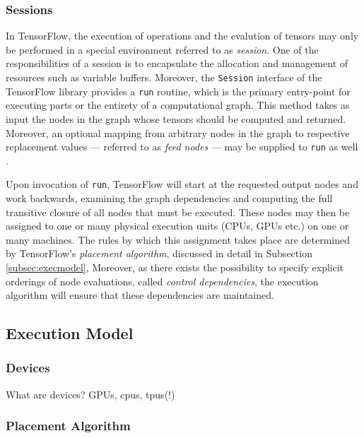 \subsubsection{Sessions}\label{sec:model-graphs-sessions}

In TensorFlow, the execution of operations and the evalution of tensors may only
be performed in a special environment referred to as \emph{session}. One of the
responsibilities of a session is to encapsulate the allocation and management of
resources such as variable buffers. Moreover, the \texttt{Session} interface of
the TensorFlow library provides a \texttt{run} routine, which is the primary
entry-point for executing parts or the entirety of a computational graph. This
method takes as input the nodes in the graph whose tensors should be computed
and returned. Moreover, an optional mapping from arbitrary nodes in the graph to
respective replacement values --- referred to as \emph{feed nodes} --- may be
supplied to \texttt{run} as well \cite{tensorflow}.

Upon invocation of \texttt{run}, TensorFlow will start at the requested output
nodes and work backwards, examining the graph dependencies and computing the
full transitive closure of all nodes that must be executed. These nodes may then
be assigned to one or many physical execution units (CPUs, GPUs etc.) on one or
many machines. The rules by which this assignment takes place are determined by
TensorFlow's \emph{placement algorithm}, discussed in detail in Subsection
\ref{subsec:execmodel}, Moreover, as there exists the possibility to specify
explicit orderings of node evaluations, called \emph{control dependencies}, the
execution algorithm will ensure that these dependencies are maintained.

\subsection{Execution Model}\label{sec:model-exec}

\subsubsection{Devices}\label{sec:model-exec-devices}

What are devices? GPUs, cpus, tpus(!)

\subsubsection{Placement Algorithm}\label{sec:model-exec-placement}

